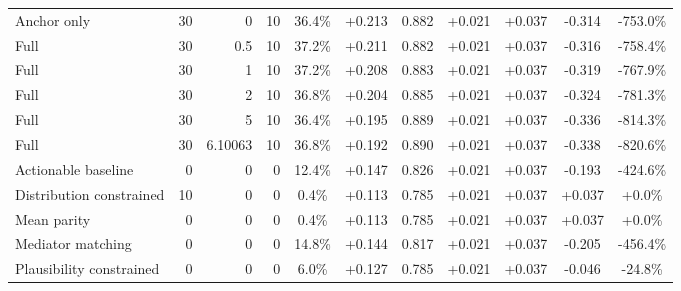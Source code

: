 \begin{table}[htbp]
\begin{tabular}{lrrrccccccc}
Anchor only & 30 & 0 & 10 & 36.4\% & +0.213 & 0.882 & +0.021 & +0.037 & -0.314 & -753.0\% \\
Full & 30 & 0.5 & 10 & 37.2\% & +0.211 & 0.882 & +0.021 & +0.037 & -0.316 & -758.4\% \\
Full & 30 & 1 & 10 & 37.2\% & +0.208 & 0.883 & +0.021 & +0.037 & -0.319 & -767.9\% \\
Full & 30 & 2 & 10 & 36.8\% & +0.204 & 0.885 & +0.021 & +0.037 & -0.324 & -781.3\% \\
Full & 30 & 5 & 10 & 36.4\% & +0.195 & 0.889 & +0.021 & +0.037 & -0.336 & -814.3\% \\
Full & 30 & 6.10063 & 10 & 36.8\% & +0.192 & 0.890 & +0.021 & +0.037 & -0.338 & -820.6\% \\
Actionable baseline & 0 & 0 & 0 & 12.4\% & +0.147 & 0.826 & +0.021 & +0.037 & -0.193 & -424.6\% \\
Distribution constrained & 10 & 0 & 0 & 0.4\% & +0.113 & 0.785 & +0.021 & +0.037 & +0.037 & +0.0\% \\
Mean parity & 0 & 0 & 0 & 0.4\% & +0.113 & 0.785 & +0.021 & +0.037 & +0.037 & +0.0\% \\
Mediator matching & 0 & 0 & 0 & 14.8\% & +0.144 & 0.817 & +0.021 & +0.037 & -0.205 & -456.4\% \\
Plausibility constrained & 0 & 0 & 0 & 6.0\% & +0.127 & 0.785 & +0.021 & +0.037 & -0.046 & -24.8\% \\
\bottomrule
\end{tabular}
\end{table}